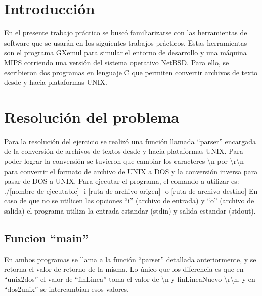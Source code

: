 \documentclass[a4paper,10pt]{article}
\begin{document}
\setcounter{page}{2}

\newpage
\thispagestyle{empty}
\tableofcontents

\newpage
\section{Introducci\'on}

En el presente trabajo pr\'actico se busc\'o familiarizarse con las
herramientas de software que se usar\'an en los siguientes trabajos
pr\'acticos. Estas herramientas son el programa GXemul para simular el
entorno de desarrollo y una m\'aquina MIPS corriendo una versi\'on del
sistema operativo NetBSD. Para ello, se escribieron dos programas en
lenguaje C que permiten convertir archivos de texto desde y hacia
plataformas UNIX. 

\section{Resoluci\'on del problema}
Para la resoluci\'on del ejercicio se realiz\'o una funci\'on llamada
``parser'' encargada de la conversi\'on de archivos de textos desde y hacia 
plataformas UNIX. Para poder lograr la conversi\'on se tuvieron que cambiar los caracteres
\textbackslash n por \textbackslash r\textbackslash n para convertir el formato de archivo de UNIX a DOS y la conversi\'on 
inversa para pasar de DOS a UNIX. 
\newline
Para ejecutar el programa, el comando a utilizar es: ./[nombre de ejecutable] -i [ruta de archivo origen] -o [ruta de archivo destino]
En caso de que no se utilicen las opciones ``i'' (archivo de entrada) y ``o'' (archivo de salida) el programa
utiliza la entrada estandar (stdin) y salida estandar (stdout).

  \subsection{Funcion ``main''}
  En ambos programas se llama a la funci\'on ``parser'' detallada anteriormente, y se retorna el valor de retorno de la misma.
  Lo \'unico que los diferencia es que en ``unix2dos'' el valor de ``finLinea'' toma el valor de \textbackslash n y finLineaNuevo \textbackslash r\textbackslash n, y en ``dos2unix''
  se intercambian esos valores.
\end{document}
